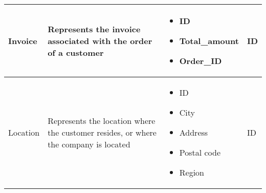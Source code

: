 \begin{longtable}{|p{}|p{} |p{}|p{} |}
    Invoice & Represents the invoice associated with the order of a customer &
    \begin{itemize}
        \vspace{-1em}
        \item ID
        \item Total\_amount     %
        \item Order\_ID
    \end{itemize}
    &  ID \\\hline

    Location & Represents the location where the customer resides, or where the company is located &
        \begin{itemize}
            \vspace{-1em}
            \item ID
            \item City
            \item Address
            \item Postal code    %
            \item Region
        \end{itemize}
    &  ID \\\hline
\end{longtable}